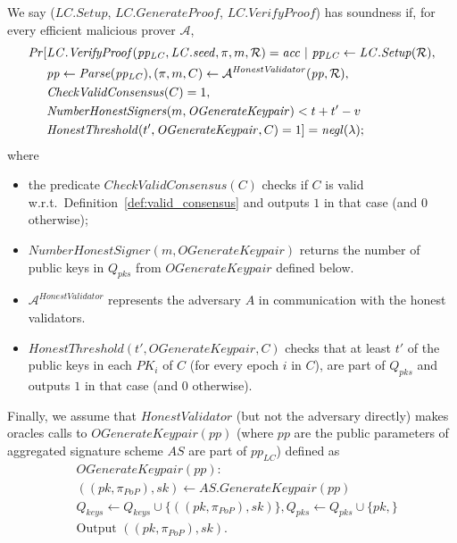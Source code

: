 \begin{definition}
We say ($\mathit{LC.Setup}$, $\mathit{LC.GenerateProof}$, $\mathit{LC.VerifyProof}$) has soundness if, 
for every efficient malicious prover $\mathcal{A}$,  
\begin{align*} 
\mathit{Pr}[&\mathit{LC.VerifyProof}(\mathit{pp_{\mathit{LC}}}, \LCseed, \pi, m, \mathcal{R}) = \mathit{acc} \ | \ \mathit{pp_{\mathit{LC}}} \leftarrow \mathit{LC.Setup}( \mathcal{R}), \\
& \mathit{pp} \leftarrow \mathit{Parse}(\mathit{pp_{LC}}), (\pi, m, C) \leftarrow \mathcal{A}^{\mathit{HonestValidator}}(\mathit{pp}, \mathcal{R}), \\
& \mathit{CheckValidConsensus}(C) =1, \\ 
& \mathit{NumberHonestSigners}(m,\mathit{OGenerateKeypair}) < t+t'-v \\
& \mathit{HonestThreshold}(t', \mathit{OGenerateKeypair}, C) = 1] = \negl({\lambda}); 
\end{align*}
\noindent where 
\begin{itemize}
\item the predicate $\mathit{CheckValidConsensus}(C)$ checks if $C$ is valid 
w.r.t.\ Definition~\ref{def:valid_consensus} and outputs $1$ in that case (and $0$ otherwise); 
\item $\mathit{NumberHonestSigner}(m,\mathit{OGenerateKeypair})$ returns the number of public keys in $Q_{\mathit{pks}}$ from $\mathit{OGenerateKeypair}$ defined below.
\item $\mathcal{A}^{\mathit{HonestValidator}}$ represents the adversary $A$ in communication with the honest validators.
\item $\mathit{HonestThreshold}(t', \mathit{OGenerateKeypair}, C)$ checks 
that at least $t'$ of the public keys in each $\mathit{PK_i}$ of $C$ (for every epoch $i$ in $C$), are part of $Q_{\mathit{pks}}$ and outputs $1$ in 
that case (and $0$ otherwise). 
\end{itemize}
Finally, we assume that $\mathit{HonestValidator}$ (but not the adversary directly) makes oracles calls to $\mathit{OGenerateKeypair}(pp)$ (where $\mathit{pp}$ are the public parameters of aggregated signature scheme $\mathit{AS}$ are 
part of $\mathit{pp_{\mathit{LC}}}$) defined as
\begin{align*}
&\mathit{OGenerateKeypair}(pp): \\
& ((\mathit{pk}, \pi_{PoP}), \mathit{sk}) \leftarrow \mathit{AS.GenerateKeypair}(\mathit{pp}) \\
& Q_{\mathit{keys}} \leftarrow Q_{\mathit{keys}} \cup \{((\mathit{pk}, \pi_{PoP}), \mathit{sk})\}, Q_{\mathit{pks}} \leftarrow Q_{\mathit{pks}} \cup \{\mathit{pk},\}  \\
& \text{Output } ((\mathit{pk}, \pi_{PoP}), \mathit{sk}).
\end{align*}
\end{definition}

